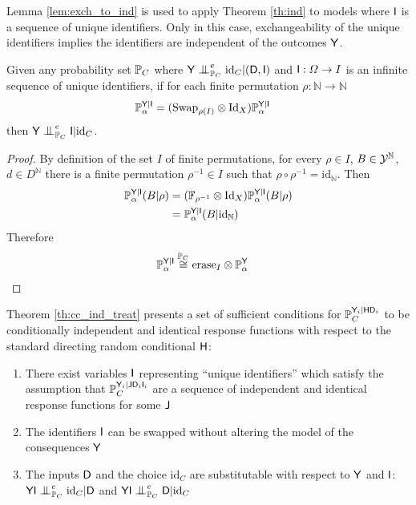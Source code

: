Lemma \ref{lem:exch_to_ind} is used to apply Theorem \ref{th:ind} to models where $\mathsf{I}$ is a sequence of unique identifiers. Only in this case, exchangeability of the unique identifiers implies the identifiers are independent of the outcomes $\mathsf{Y}$.

\begin{lemma}\label{lem:exch_to_ind}
Given any probability set $\mathbb{P}_C$ where $\RV{Y}\CI_{\prob{P}_C}^e \text{id}_C|(\RV{D},\RV{I})$ and $\mathsf{I}:\Omega\to I$ is an infinite sequence of unique identifiers, if for each finite permutation $\rho:\mathbb{N}\to \mathbb{N}$
\begin{align}
    \mathbb{P}_\alpha^{\mathsf{Y}|\mathsf{I}} &= (\text{Swap}_{\rho(I)}\otimes \text{Id}_X )\mathbb{P}_\alpha^{\mathsf{Y}|\mathsf{I}}
\end{align}
then $\RV{Y}\CI_{\prob{P}_C}^e \RV{I}|\text{id}_C$.
\end{lemma}

\begin{proof}
By definition of the set $I$ of finite permutations, for every $\rho\in I$, $B\in\mathcal{Y}^{\mathbb{N}}$, $d\in D^{\mathbb{N}}$ there is a finite permutation $\rho^{-1}\in I$ such that $\rho\circ\rho^{-1}=\text{id}_{\mathbb{N}}$. Then
\begin{align}
    \mathbb{P}_\alpha^{\mathsf{Y}|\mathsf{I}}(B|\rho) &= (\mathbb{F}_{\rho^{-1}}\otimes \text{Id}_X )\mathbb{P}_\alpha^{\mathsf{Y}|\mathsf{I}}(B|\rho)\\
    &= \mathbb{P}_\alpha^{\mathsf{Y}|\mathsf{I}}(B|\text{id}_{\mathbb{N}})
\end{align}
Therefore
\begin{align}
    \mathbb{P}_\alpha^{\mathsf{Y}|\mathsf{I}} &\overset{\mathbb{P}_C}{\cong} \text{erase}_{I}\otimes \mathbb{P}_\alpha^{\mathsf{Y}}
\end{align}
\end{proof}

Theorem \ref{th:cc_ind_treat} presents a set of sufficient conditions for $\mathbb{P}_C^{\mathsf{Y}_i|\mathsf{H}\mathsf{D}_i}$ to be conditionally independent and identical response functions with respect to the standard directing random conditional $\mathsf{H}$:
\begin{enumerate}
    \item There exist variables $\mathsf{I}$ representing ``unique identifiers'' which satisfy the assumption that $\mathbb{P}_C^{\mathsf{Y}_i|\mathsf{J}\mathsf{D}_i\mathsf{I}_i}$ are a sequence of independent and identical response functions for some $\mathsf{J}$
    \item The identifiers $\mathsf{I}$ can be swapped without altering the model of the consequences $\mathsf{Y}$
    \item The inputs $\mathsf{D}$ and the choice $\text{id}_C$ are substitutable with respect to $\mathsf{Y}$ and $\mathsf{I}$: $\RV{YI}\CI^e_{\prob{P}_C} \text{id}_C|\RV{D}$ and $\RV{YI}\CI^e_{\prob{P}_C} \RV{D}|\text{id}_C$
\end{enumerate}

